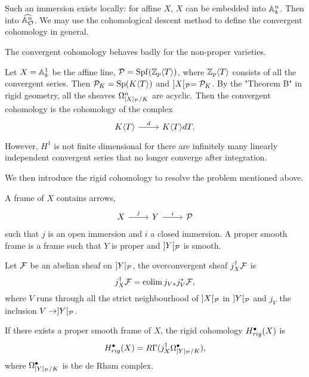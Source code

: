 \begin{remark}
    Such an immersion exists locally: for affine $X$, $X$ can be embedded into ${\mathbb {A}}_k^n$. 
    Then into $\widehat{{\mathbb {A}}^n_{{\mathcal {O}}}}$. 
    We may use the cohomological descent method 
    to define the convergent cohomology in general. 
\end{remark}

The convergent cohomology behaves badly for the non-proper varieties.
\begin{example}
    \label{counter ex}
    Let $X = {\mathbb {A}}_k^1$ be the affine line, ${\mathcal {P}} = \operatorname{Spf} ({\mathbb {Z}}_p \langle T \rangle)$, 
    where ${\mathbb {Z}}_p \langle T \rangle$ consists of all the convergent series. 
    Then ${\mathcal {P}}_K = \operatorname{Sp} (K \langle T \rangle)$ and $]X[_{\mathcal {P}} = {\mathcal {P}}_K$. 
    By the "Theorem B" in rigid geometry, all the sheaves $\Omega_{]X[_{\mathcal {P}}/K}^n$ are acyclic. 
    Then the convergent cohomology is the cohomology of the complex
    \[
        \begin{tikzcd}
            K \langle T \rangle \ar[r,"d"] & K \langle T \rangle dT.
        \end{tikzcd}
    \]
    However, $H^1$ is not finite dimensional 
    for there are infinitely many linearly independent convergent series 
    that no longer converge after integration.
\end{example}

We then introduce the rigid cohomology to resolve the problem mentioned above.
\begin{definition}
    A frame of $X$ contains arrows,
    \[
        \begin{tikzcd}
            X \ar[r,"j"] & Y \ar[r,"i"] & \CP
        \end{tikzcd}
    \]
    such that $j$ is an open immersion and $i$ a closed immersion. 
    A proper smooth frame is a frame such that $Y$ is proper and $]Y[_{\mathcal {P}}$ is smooth. 
\end{definition}

\begin{definition}
    Let ${\mathcal {F}}$ be an abelian sheaf on $]Y[_{\mathcal {P}}$, 
    the overconvergent sheaf $j_X^\dagger {\mathcal {F}}$ is 
    \[
        j_X^\dagger {\mathcal {F}} = \operatorname{colim} j_{V*} j_{V}^* {\mathcal {F}},
    \]
    where $V$ runs through all the strict neighbourhood of $]X[_{\mathcal {P}}$ in $]Y[_{\mathcal {P}}$ 
    and $j_V$ the inclusion $V \to ]Y[_{\mathcal {P}}$. 
\end{definition}

\begin{definition}
    If there exists a proper smooth frame of $X$, the rigid cohomology $H^\bullet_{rig}(X)$ is 
    \[
        H^\bullet_{rig}(X) = R\Gamma(j_X^ \dagger \Omega_{]Y[_{\mathcal {P}}/K}^\bullet),
    \]
    where $\Omega_{]Y[_{\mathcal {P}}/K}^\bullet$ is the de Rham complex.
\end{definition}

